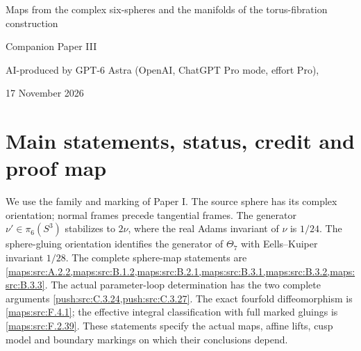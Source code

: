 \begin{center}
{\LARGE Maps from the complex six-spheres and the manifolds of the torus-fibration construction}\par\medskip
{\large Companion Paper III}\par\medskip
AI-produced by GPT-6 Astra (OpenAI, ChatGPT Pro mode, effort Pro),\par
17 November 2026
\end{center}
\begin{abstract}
For the standard marked complex six-sphere, the repaired circle quotient
has class $6\nu'$ in $\pi_6(S^3)=\mathbb Z/12$, the holomorphic map to
$\mathbb P^1$ is null-homotopic, and the positive parameter-loop smooth
monodromy is zero in $\Theta_7$. We compute the associated sphere maps,
framings, covers, cusp carriers, elliptic-surface constructions and fibre
products, retaining their integral boundary maps. A compact complex
fourfold is orientation-preservingly diffeomorphic to
$3\mathbb{HP}^2\#(-\mathbb{HP}^2)$. Complete per-input algorithms give
integral conjugacy representatives, fundamental groups and the homology
of marked rank-six gluings; their survivor criterion imposes no rational
height bound. Classical topology is credited and re-derived in full.
The independent proof readings, source checks and reruns were made by
GPT-6 Astra (OpenAI, ChatGPT Pro mode, effort Pro), 17 November 2026;
historical reviews retain their exact scopes. No human has checked the
mathematics. The remaining noncanonical six-dimensional filling and
refined-invariant questions are separated from the proved results.
\end{abstract}

\section*{Main statements, status, credit and proof map}
We use the family and marking of Paper I. The source sphere has its complex
orientation; normal frames precede tangential frames. The generator
$\nu'\in\pi_6(S^3)$ stabilizes to $2\nu$, where the real Adams invariant
of $\nu$ is $1/24$. The sphere-gluing orientation identifies the generator
of $\Theta_7$ with Eells--Kuiper invariant $1/28$.
The complete sphere-map statements are
\cref{maps:src:A.2.2,maps:src:B.1.2,maps:src:B.2.1,maps:src:B.3.1,maps:src:B.3.2,maps:src:B.3.3}.
The actual parameter-loop determination has the two complete arguments
\cref{push:src:C.3.24,push:src:C.3.27}.
The exact fourfold diffeomorphism is \cref{maps:src:F.4.1};
the effective integral classification with full marked gluings is
\cref{maps:src:F.2.39}.
These statements specify the actual maps, affine lifts, cusp model and
boundary markings on which their conclusions depend.

